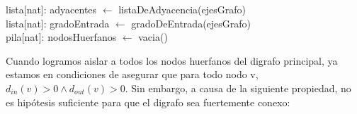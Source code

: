 \begin{algorithm}[H]
		\NoCaptionOfAlgo
		\caption{}
		
		lista[nat]: adyacentes $\leftarrow$ listaDeAdyacencia(ejesGrafo)\\
		lista[nat]: gradoEntrada $\leftarrow$ gradoDeEntrada(ejesGrafo)\\
		pila[nat]: nodosHuerfanos $\leftarrow$ vacia()\\

	\end{algorithm}


Cuando logramos aislar a todos los nodos huerfanos del digrafo principal, ya estamos en condiciones de asegurar que para todo nodo v, $d_{in} (v) > 0 \land d_{out} (v) > 0$. Sin embargo, a causa de la siguiente propiedad, no es hipótesis suficiente para que el digrafo sea fuertemente conexo:

